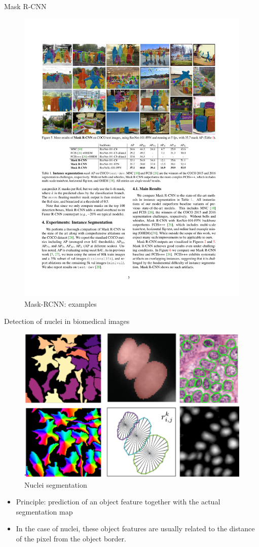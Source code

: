 \documentclass[xcolor=pdftex,dvipsnames,table]{beamer}
\begin{document}
\begin{frame}{Mask R-CNN}
\begin{figure}[htb]
   \centering
   \includegraphics[width=.7\textwidth]{../graphics/Mask_RCNN_example.pdf}
   \caption{Mask-RCNN: examples}
\end{figure}
\end{frame}

\begin{frame}{Detection of nuclei in biomedical images}
\begin{figure}[htb]
   \centering
   \includegraphics[width=.7\textwidth]{../graphics/Nuclei_Detection.pdf}
   \caption{Nuclei segmentation}
\end{figure}
\begin{itemize}
   \item Principle: prediction of an object feature together with the actual segmentation map
   \item In the case of nuclei, these object features are usually related to the distance of the pixel from the object border.
\end{itemize}
\end{frame}
\end{document}
